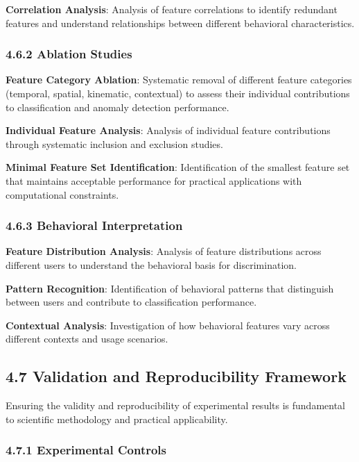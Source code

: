 \documentclass[
  11pt,
  a4paper,
]{article}
\begin{document}
\textbf{Correlation Analysis}: Analysis of feature correlations to
identify redundant features and understand relationships between
different behavioral characteristics.

\subsubsection{4.6.2 Ablation Studies}\label{ablation-studies}

\textbf{Feature Category Ablation}: Systematic removal of different
feature categories (temporal, spatial, kinematic, contextual) to assess
their individual contributions to classification and anomaly detection
performance.

\textbf{Individual Feature Analysis}: Analysis of individual feature
contributions through systematic inclusion and exclusion studies.

\textbf{Minimal Feature Set Identification}: Identification of the
smallest feature set that maintains acceptable performance for practical
applications with computational constraints.

\subsubsection{4.6.3 Behavioral
Interpretation}\label{behavioral-interpretation}

\textbf{Feature Distribution Analysis}: Analysis of feature
distributions across different users to understand the behavioral basis
for discrimination.

\textbf{Pattern Recognition}: Identification of behavioral patterns that
distinguish between users and contribute to classification performance.

\textbf{Contextual Analysis}: Investigation of how behavioral features
vary across different contexts and usage scenarios.

\subsection{4.7 Validation and Reproducibility
Framework}\label{validation-and-reproducibility-framework}

Ensuring the validity and reproducibility of experimental results is
fundamental to scientific methodology and practical applicability.

\subsubsection{4.7.1 Experimental Controls}\label{experimental-controls}
\end{document}
